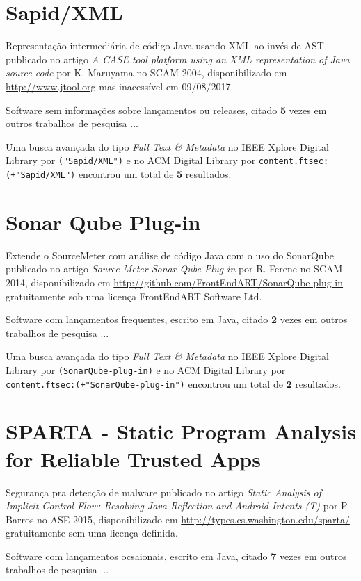\section{Sapid/XML}

Representação intermediária de código Java usando XML ao invés de AST
publicado no artigo {\it A CASE tool platform using an XML representation of Java source code}
por K. Maruyama
no SCAM 2004,
disponibilizado em \url{http://www.jtool.org}
mas inacessível em 09/08/2017.

Software sem informações sobre lançamentos ou releases,
citado {\bf 5} vezes em outros trabalhos de pesquisa ...

Uma busca avançada do tipo {\it Full Text \& Metadata} no IEEE Xplore Digital Library por
\texttt{("Sapid/XML")}
e no ACM Digital Library por
\texttt{content.ftsec:(+"Sapid/XML")}
encontrou um total de
{\bf 5}
resultados.

\section{Sonar Qube Plug-in}

Extende o SourceMeter com análise de código Java com o uso do SonarQube
publicado no artigo {\it Source Meter Sonar Qube Plug-in}
por R. Ferenc
no SCAM 2014,
disponibilizado em \url{http://github.com/FrontEndART/SonarQube-plug-in}
gratuitamente
sob uma licença FrontEndART Software Ltd.

Software com lançamentos frequentes,
escrito em Java,
citado {\bf 2} vezes em outros trabalhos de pesquisa ...

Uma busca avançada do tipo {\it Full Text \& Metadata} no IEEE Xplore Digital Library por
\texttt{(SonarQube-plug-in)}
e no ACM Digital Library por
\texttt{content.ftsec:(+"SonarQube-plug-in")}
encontrou um total de
{\bf 2}
resultados.

\section{SPARTA - Static Program Analysis for Reliable Trusted Apps}

Segurança pra detecção de malware
publicado no artigo {\it Static Analysis of Implicit Control Flow: Resolving Java Reflection and Android Intents (T)}
por P. Barros
no ASE 2015,
disponibilizado em \url{http://types.cs.washington.edu/sparta/}
gratuitamente
sem uma licença definida.

Software com lançamentos ocsaionais,
escrito em Java,
citado {\bf 7} vezes em outros trabalhos de pesquisa ...

